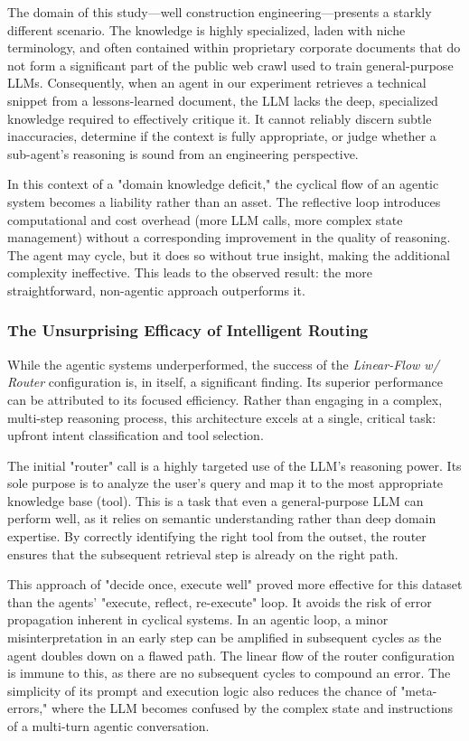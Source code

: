             The domain of this study---well construction engineering---presents a starkly different scenario. The knowledge is highly specialized, laden with niche terminology, and often contained within proprietary corporate documents that do not form a significant part of the public web crawl used to train general-purpose LLMs. Consequently, when an agent in our experiment retrieves a technical snippet from a lessons-learned document, the LLM lacks the deep, specialized knowledge required to effectively critique it. It cannot reliably discern subtle inaccuracies, determine if the context is fully appropriate, or judge whether a sub-agent's reasoning is sound from an engineering perspective.
            
            In this context of a "domain knowledge deficit," the cyclical flow of an agentic system becomes a liability rather than an asset. The reflective loop introduces computational and cost overhead (more LLM calls, more complex state management) without a corresponding improvement in the quality of reasoning. The agent may cycle, but it does so without true insight, making the additional complexity ineffective. This leads to the observed result: the more straightforward, non-agentic approach outperforms it.
        
        \subsubsection{The Unsurprising Efficacy of Intelligent Routing}
            
            While the agentic systems underperformed, the success of the \textit{Linear-Flow w/ Router} configuration is, in itself, a significant finding. Its superior performance can be attributed to its focused efficiency. Rather than engaging in a complex, multi-step reasoning process, this architecture excels at a single, critical task: upfront intent classification and tool selection.
            
            The initial "router" call is a highly targeted use of the LLM's reasoning power. Its sole purpose is to analyze the user's query and map it to the most appropriate knowledge base (tool). This is a task that even a general-purpose LLM can perform well, as it relies on semantic understanding rather than deep domain expertise. By correctly identifying the right tool from the outset, the router ensures that the subsequent retrieval step is already on the right path.
            
            This approach of "decide once, execute well" proved more effective for this dataset than the agents' "execute, reflect, re-execute" loop. It avoids the risk of error propagation inherent in cyclical systems. In an agentic loop, a minor misinterpretation in an early step can be amplified in subsequent cycles as the agent doubles down on a flawed path. The linear flow of the router configuration is immune to this, as there are no subsequent cycles to compound an error. The simplicity of its prompt and execution logic also reduces the chance of "meta-errors," where the LLM becomes confused by the complex state and instructions of a multi-turn agentic conversation.
        
